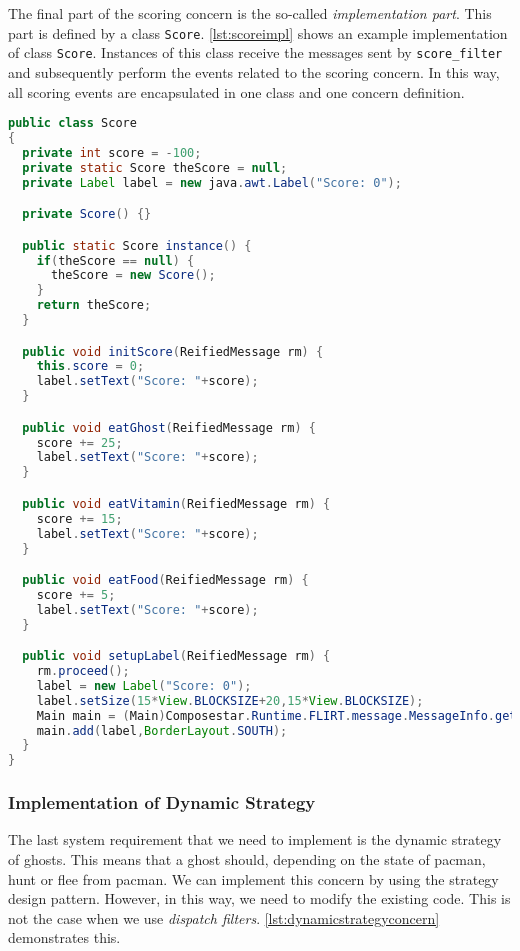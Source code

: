 The final part of the scoring concern is the so-called \emph{implementation part}.
This part is defined by a class \lstinline|Score|.
\autoref{lst:scoreimpl} shows an example implementation of class \lstinline|Score|.
Instances of this class receive the messages sent by \lstinline|score_filter| and subsequently perform the events related to the scoring concern.
In this way, all scoring events are encapsulated in one class and one \Compose* concern definition. 

\begin{lstlisting}[style=floatlisting,language=Java,%
                   caption={Implementation of class \expandafter{\lstinline[style=inline]|Score|}},%
                   label={lst:scoreimpl}]
public class Score 
{
  private int score = -100;
  private static Score theScore = null;
  private Label label = new java.awt.Label("Score: 0");

  private Score() {}

  public static Score instance() {
    if(theScore == null) {
      theScore = new Score();
    }
    return theScore;
  }

  public void initScore(ReifiedMessage rm) {
    this.score = 0;
    label.setText("Score: "+score);
  }

  public void eatGhost(ReifiedMessage rm) {
    score += 25;
    label.setText("Score: "+score);
  }

  public void eatVitamin(ReifiedMessage rm) {
    score += 15;
    label.setText("Score: "+score);
  }

  public void eatFood(ReifiedMessage rm) {
    score += 5;
    label.setText("Score: "+score);
  }

  public void setupLabel(ReifiedMessage rm) {
    rm.proceed();
    label = new Label("Score: 0");
    label.setSize(15*View.BLOCKSIZE+20,15*View.BLOCKSIZE);
    Main main = (Main)Composestar.Runtime.FLIRT.message.MessageInfo.getMessageInfo().getTarget();
    main.add(label,BorderLayout.SOUTH);
  }
}
\end{lstlisting}

\subsubsection{Implementation of Dynamic Strategy}

The last system requirement that we need to implement is the dynamic strategy of ghosts.
This means that a ghost should, depending on the state of pacman, hunt or flee from pacman.
We can implement this concern by using the strategy design pattern.
However, in this way, we need to modify the existing code.
This is not the case when we use \Compose*{} \emph{dispatch filters}.
\autoref{lst:dynamicstrategyconcern} demonstrates this. 

